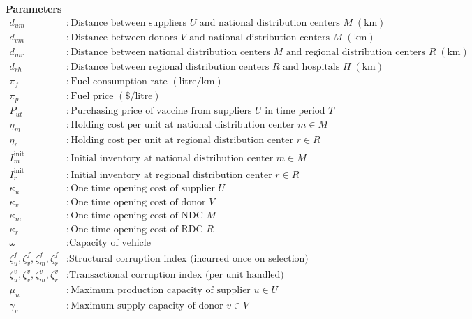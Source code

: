 \documentclass[a4paper]{elsarticle}
\begin{document}
{\noindent \textbf{Parameters}\\
\begin{align*}
d_{u m} & : \text{Distance between suppliers } U \text{ and national distribution centers } M \; (\text{km})\\
d_{v m} & : \text{Distance between donors } V \text{ and national distribution centers } M \; (\text{km})\\
d_{m r} & : \text{Distance between national distribution centers } M \text{ and regional distribution centers } R \; (\text{km})\\
d_{r h} & : \text{Distance between regional distribution centers } R \text{ and hospitals } H \; (\text{km})\\
\pi_{f} & : \text{Fuel consumption rate } (\text{litre/km})\\
\pi_{p} & : \text{Fuel price } (\$/\text{litre})\\
P_{u t} & : \text{Purchasing price of vaccine from suppliers } U \text{ in time period } T\\
\eta_{m} & : \text{Holding cost per unit at national distribution center } m \in M \\
\eta_{r} & : \text{Holding cost per unit at regional distribution center } r \in R \\
I^{\text{init}}_{m} & : \text{Initial inventory at national distribution center } m \in M \\
I^{\text{init}}_{r} & : \text{Initial inventory at regional distribution center } r \in R \\
\kappa_{u} & : \text{One time opening cost of supplier } U \\
\kappa_{v} & : \text{One time opening cost of donor } V \\
\kappa_{m} & : \text{One time opening cost of NDC } M \\
\kappa_{r} & : \text{One time opening cost of RDC } R \\
\omega & : \text{Capacity of vehicle}\\
\zeta^{f}_{u},\zeta^{f}_{v},\zeta^{f}_{m},\zeta^{f}_{r} & : \text{Structural corruption index (incurred once on selection)}\\
\zeta^{v}_{u},\zeta^{v}_{v},\zeta^{v}_{m},\zeta^{v}_{r} & : \text{Transactional corruption index (per unit handled)}\\
\mu_{u} & : \text{Maximum production capacity of supplier } u \in U \\
\gamma_{v} & : \text{Maximum supply capacity of donor } v \in V \\

\end{align*}}
\end{document}
